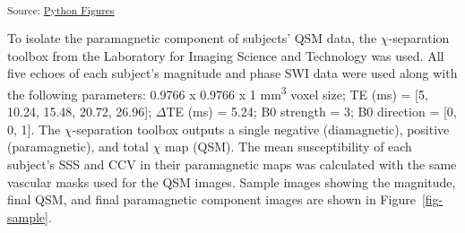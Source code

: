 \documentclass[
true
]{sn-jnl}
\begin{document}
\textsubscript{Source:
\href{https://WeberLab.github.io/Chisep_CSVO2_Manuscript/notebooks/Figures.ipynb.html\#cell-fig-masks}{Python
Figures}}

To isolate the paramagnetic component of subjects' QSM data, the
\(\chi\)-separation toolbox
\citep{shinHseparationMagneticSusceptibility2021} from the Laboratory
for Imaging Science and Technology was used. All five echoes of each
subject's magnitude and phase SWI data were used along with the
following parameters: 0.9766 x 0.9766 x 1 mm\textsuperscript{3} voxel
size; TE (ms) = {[}5, 10.24, 15.48, 20.72, 26.96{]}; \(\Delta\)TE (ms) =
5.24; B0 strength = 3; B0 direction = {[}0, 0, 1{]}. The
\(\chi\)-separation toolbox outputs a single negative (diamagnetic),
positive (paramagnetic), and total \(\chi\) map (QSM). The mean
susceptibility of each subject's SSS and CCV in their paramagnetic maps
was calculated with the same vascular masks used for the QSM images.
Sample images showing the magnitude, final QSM, and final paramagnetic
component images are shown in Figure~\ref{fig-sample}.
\end{document}
